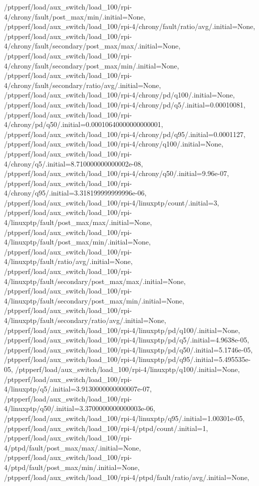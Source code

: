{    /ptpperf/load/aux_switch/load_100/rpi-4/chrony/fault/post_max/min/.initial=None,
    /ptpperf/load/aux_switch/load_100/rpi-4/chrony/fault/ratio/avg/.initial=None,
    /ptpperf/load/aux_switch/load_100/rpi-4/chrony/fault/secondary/post_max/max/.initial=None,
    /ptpperf/load/aux_switch/load_100/rpi-4/chrony/fault/secondary/post_max/min/.initial=None,
    /ptpperf/load/aux_switch/load_100/rpi-4/chrony/fault/secondary/ratio/avg/.initial=None,
    /ptpperf/load/aux_switch/load_100/rpi-4/chrony/pd/q100/.initial=None,
    /ptpperf/load/aux_switch/load_100/rpi-4/chrony/pd/q5/.initial=0.00010081,
    /ptpperf/load/aux_switch/load_100/rpi-4/chrony/pd/q50/.initial=0.00010640000000000001,
    /ptpperf/load/aux_switch/load_100/rpi-4/chrony/pd/q95/.initial=0.0001127,
    /ptpperf/load/aux_switch/load_100/rpi-4/chrony/q100/.initial=None,
    /ptpperf/load/aux_switch/load_100/rpi-4/chrony/q5/.initial=8.710000000000002e-08,
    /ptpperf/load/aux_switch/load_100/rpi-4/chrony/q50/.initial=9.96e-07,
    /ptpperf/load/aux_switch/load_100/rpi-4/chrony/q95/.initial=3.318199999999996e-06,
    /ptpperf/load/aux_switch/load_100/rpi-4/linuxptp/count/.initial=3,
    /ptpperf/load/aux_switch/load_100/rpi-4/linuxptp/fault/post_max/max/.initial=None,
    /ptpperf/load/aux_switch/load_100/rpi-4/linuxptp/fault/post_max/min/.initial=None,
    /ptpperf/load/aux_switch/load_100/rpi-4/linuxptp/fault/ratio/avg/.initial=None,
    /ptpperf/load/aux_switch/load_100/rpi-4/linuxptp/fault/secondary/post_max/max/.initial=None,
    /ptpperf/load/aux_switch/load_100/rpi-4/linuxptp/fault/secondary/post_max/min/.initial=None,
    /ptpperf/load/aux_switch/load_100/rpi-4/linuxptp/fault/secondary/ratio/avg/.initial=None,
    /ptpperf/load/aux_switch/load_100/rpi-4/linuxptp/pd/q100/.initial=None,
    /ptpperf/load/aux_switch/load_100/rpi-4/linuxptp/pd/q5/.initial=4.9638e-05,
    /ptpperf/load/aux_switch/load_100/rpi-4/linuxptp/pd/q50/.initial=5.1746e-05,
    /ptpperf/load/aux_switch/load_100/rpi-4/linuxptp/pd/q95/.initial=5.495535e-05,
    /ptpperf/load/aux_switch/load_100/rpi-4/linuxptp/q100/.initial=None,
    /ptpperf/load/aux_switch/load_100/rpi-4/linuxptp/q5/.initial=3.9130000000000007e-07,
    /ptpperf/load/aux_switch/load_100/rpi-4/linuxptp/q50/.initial=3.3700000000000003e-06,
    /ptpperf/load/aux_switch/load_100/rpi-4/linuxptp/q95/.initial=1.00301e-05,
    /ptpperf/load/aux_switch/load_100/rpi-4/ptpd/count/.initial=1,
    /ptpperf/load/aux_switch/load_100/rpi-4/ptpd/fault/post_max/max/.initial=None,
    /ptpperf/load/aux_switch/load_100/rpi-4/ptpd/fault/post_max/min/.initial=None,
    /ptpperf/load/aux_switch/load_100/rpi-4/ptpd/fault/ratio/avg/.initial=None,
}
